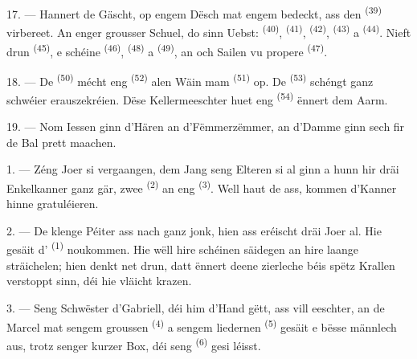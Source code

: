 \VUsaut{2.4mm}
\VUsaut{3.0mm}

17. --- Hannert de Gäscht, op engem Dësch mat engem  bedeckt, ass
den  \textsuperscript{(39)} virbereet. An enger grousser Schuel, do
sinn Uebst:  \textsuperscript{(40)}, 
\textsuperscript{(41)},  \textsuperscript{(42)},
 \textsuperscript{(43)} a 
\textsuperscript{(44)}. Nieft drun  \textsuperscript{(45)}, e schéine
 \textsuperscript{(46)},  \textsuperscript{(48)} a
 \textsuperscript{(49)}, an och Sailen vu propere
 \textsuperscript{(47)}.

18. --- De  \textsuperscript{(50)} mécht eng
 \textsuperscript{(52)} alen Wäin mam 
\textsuperscript{(51)} op. De  \textsuperscript{(53)} schéngt ganz
schwéier erauszekréien. Dëse Kellermeeschter huet eng 
\textsuperscript{(54)} ënnert dem Aarm.

19. --- Nom Iessen ginn d'Hären an d'Fëmmerzëmmer, an d'Damme ginn sech fir de Bal
prett maachen.

\VUsaut{5.0mm}
\VUsaut{1.6mm}
\VUsaut{2.6mm}

\VUsaut{3.0mm}

1. --- Zéng Joer si vergaangen, dem Jang seng Elteren si al ginn a hunn hir dräi
Enkelkanner ganz gär, zwee  \textsuperscript{(2)} an eng
 \textsuperscript{(3)}. Well haut de 
ass, kommen d'Kanner hinne gratuléieren.

2. --- De klenge Péiter ass nach ganz jonk, hien ass eréischt dräi Joer al. Hie
gesäit d' \textsuperscript{(1)} noukommen. Hie wëll hire schéinen
säidegen  an hire laange  sträichelen; hien denkt net
drun, datt ënnert deene zierleche  béis spëtz Krallen verstoppt sinn,
déi hie vläicht krazen.

3. --- Seng Schwëster d'Gabriell, déi him d'Hand gëtt, ass vill eeschter, an de
Marcel mat sengem groussen  \textsuperscript{(4)} a sengem
liedernen  \textsuperscript{(5)} gesäit e bësse männlech aus, trotz
senger kurzer Box, déi seng  \textsuperscript{(6)} gesi léisst.

